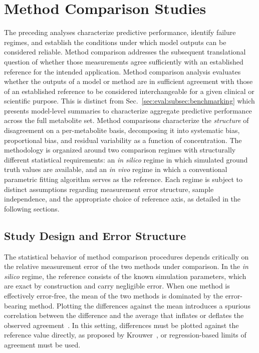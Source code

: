 \section{Method Comparison Studies}
\label{sec:Reg:subsec:comparison}
The preceding analyses characterize predictive performance, identify failure regimes, and establish the conditions under which model outputs can be considered reliable. Method comparison addresses the subsequent translational question of whether those measurements agree sufficiently with an established reference for the intended application. Method comparison analysis evaluates whether the outputs of a model or method are in sufficient agreement with those of an established reference to be considered interchangeable for a given clinical or scientific purpose. This is distinct from Sec.~\ref{sec:eval:subsec:benchmarking} which presents model-level summaries to characterize aggregate predictive performance across the full metabolite set. Method comparisons characterize the \textit{structure} of disagreement on a per-metabolite basis, decomposing it into systematic bias, proportional bias, and residual variability as a function of concentration. The methodology is organized around two comparison regimes with structurally different statistical requirements: an \textit{in silico} regime in which simulated ground truth values are available, and an \textit{in vivo} regime in which a conventional parametric fitting algorithm serves as the reference. Each regime is subject to distinct assumptions regarding measurement error structure, sample independence, and the appropriate choice of reference axis, as detailed in the following sections.

\subsection{Study Design and Error Structure}
\label{sec:Reg:subsec:comparison:subsubsec:design}
The statistical behavior of method comparison procedures depends critically on the relative measurement error of the two methods under comparison. In the \textit{in silico} regime, the reference consists of the known simulation parameters, which are exact by construction and carry negligible error. When one method is effectively error-free, the mean of the two methods is dominated by the error-bearing method. Plotting the differences against the mean introduces a spurious correlation between the difference and the average that inflates or deflates the observed agreement~\cite{Krouwer2008}. In this setting, differences must be plotted against the reference value directly, as proposed by Krouwer~\cite{Krouwer2008}, or regression-based limits of agreement must be used. 

